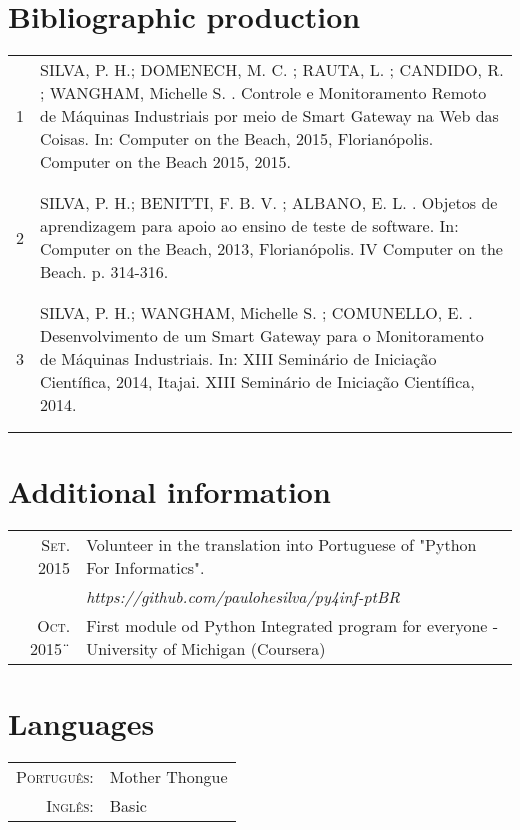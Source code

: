 \documentclass[a4paper,10pt]{article}
\begin{document}
\section{Bibliographic production}
\begin{tabular}{r|p{11cm}}

\textsc{1} & SILVA, P. H.; DOMENECH, M. C. ; RAUTA, L. ; CANDIDO, R. ; WANGHAM, Michelle S. . Controle e Monitoramento Remoto de Máquinas Industriais por meio de Smart Gateway na Web das Coisas. In: Computer on the Beach, 2015, Florianópolis. Computer on the Beach 2015, 2015.\\\\\multicolumn{2}{c}{} \\

\textsc{2} & SILVA, P. H.; BENITTI, F. B. V. ; ALBANO, E. L. . Objetos de aprendizagem para apoio ao ensino de teste de software. In: Computer on the Beach, 2013, Florianópolis. IV Computer on the Beach. p. 314-316.\\\\\multicolumn{2}{c}{} \\

\textsc{3} & SILVA, P. H.; WANGHAM, Michelle S. ; COMUNELLO, E. . Desenvolvimento de um Smart Gateway para o Monitoramento de Máquinas Industriais. In: XIII Seminário de Iniciação Científica, 2014, Itajai. XIII Seminário de Iniciação Científica, 2014.\\\\\multicolumn{2}{c}{} \\

\end{tabular}

\section{Additional information}
\begin{tabular}{rl}
\textsc{Set. 2015} & Volunteer in the translation into Portuguese of "Python For Informatics".\normalsize\\ &\emph{https://github.com/paulohesilva/py4inf-ptBR}\\
\textsc{Oct. 2015}¨& First module od Python Integrated program for everyone - University of Michigan (Coursera)
\end{tabular}

\section{Languages}
\begin{tabular}{rl}
 \textsc{Português:}&Mother Thongue\\
\textsc{Inglês:}&Basic\\
\end{tabular}
\end{document}
